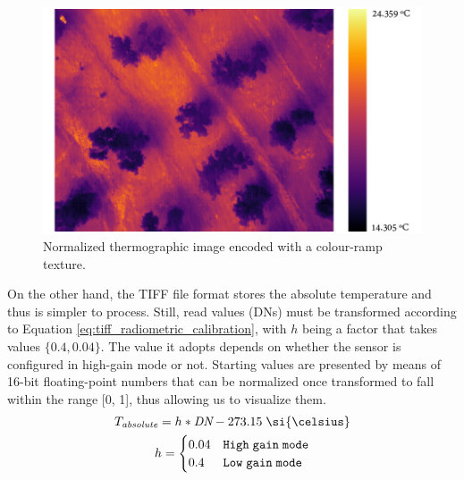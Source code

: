 \begin{figure}[ht]
	\centering
	\includegraphics{figs/materials/thermal_inferno_temperature.png}
	\caption{Normalized thermographic image encoded with a colour-ramp texture. }
	\label{fig:thermal_inferno_temperature}
\end{figure}

On the other hand, the TIFF file format stores the absolute temperature and thus is simpler to process. Still, read values (DNs) must be transformed according to Equation \ref{eq:tiff_radiometric_calibration}, with $h$ being a factor that takes values $\{0.4, 0.04\}$. The value it adopts depends on whether the sensor is configured in high-gain mode or not. Starting values are presented by means of 16-bit floating-point numbers that can be normalized once transformed to fall within the range [0, 1], thus allowing us to visualize them.
\begin{gather}
    \label{eq:tiff_radiometric_calibration}
    \begin{aligned}
        T_{\textit{absolute}} &= h * \textit{DN} - 273.15 \hspace{1mm} \si{\celsius}\\
    \end{aligned}\\
    h=\begin{cases}
        0.04 &\mathtt{High \hspace{1mm} gain \hspace{1mm} mode}\\
        0.4 &\mathtt{Low \hspace{1mm} gain \hspace{1mm} mode}\\
    \end{cases}
\end{gather}

